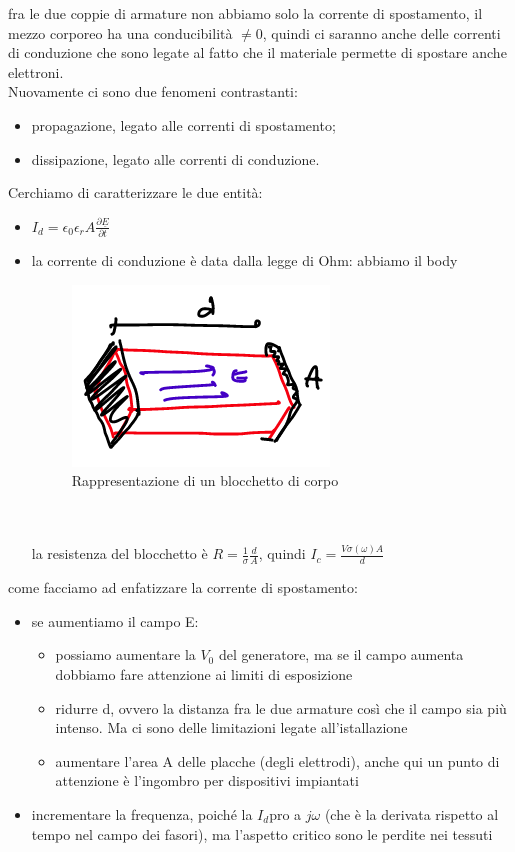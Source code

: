 \documentclass[oneside, 12pt]{extbook}
\begin{document}
fra le due coppie di armature non abbiamo solo la corrente di spostamento, il mezzo corporeo ha una conducibilità $\neq 0$, quindi ci saranno anche delle correnti di conduzione che sono legate al fatto che il materiale permette di spostare anche elettroni.\\Nuovamente ci sono due fenomeni contrastanti:
\begin{itemize}
	\item propagazione, legato alle correnti di spostamento;
	\item dissipazione, legato alle correnti di conduzione.
\end{itemize}
Cerchiamo di caratterizzare le due entità:
\begin{itemize}
	\item $I_d = \epsilon_0 \epsilon_r A \frac{\partial\underline{E}}{\partial t}$
	\item la corrente di conduzione è data dalla legge di Ohm: abbiamo il body \\
	\begin{figure}[!h]
		\includegraphics[scale=0.7]{immagini/rapp_body.png}
		\caption{Rappresentazione di un blocchetto di corpo}
	\end{figure}\\\\
	la resistenza del blocchetto è $R = \frac{1}{\sigma} \frac{d}{A}$, quindi $I_c = \frac{V\sigma(\omega)A}{d}$
\end{itemize}
come facciamo ad enfatizzare la corrente di spostamento:
\begin{itemize}
	\item se aumentiamo il campo E:
	\begin{itemize}
		\item possiamo aumentare la $V_0$ del generatore, ma se il campo aumenta dobbiamo fare attenzione ai limiti di esposizione
		\item ridurre d, ovvero la distanza fra le due armature così che il campo sia più intenso. Ma ci sono delle limitazioni legate all'istallazione
		\item aumentare l'area A delle placche (degli elettrodi), anche qui un punto di attenzione è l'ingombro per dispositivi impiantati
	\end{itemize}
	\item incrementare la frequenza, poiché la $I_d $pro a $j\omega$ (che è la derivata rispetto al tempo nel campo dei fasori), ma l'aspetto critico sono le perdite nei tessuti
\end{itemize}
\end{document}
